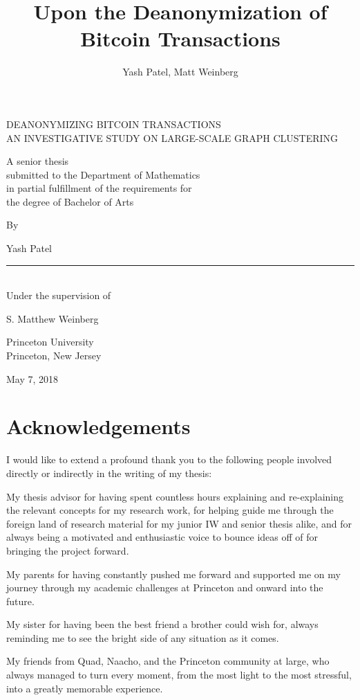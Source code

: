 \documentclass{article}
\begin{document}
\title{Upon the Deanonymization of Bitcoin Transactions}
\author{Yash Patel, Matt Weinberg}

\begin{center}
\thispagestyle{empty}
\parskip=14pt%
\vspace*{5\parskip}%
\LARGE{DEANONYMIZING BITCOIN TRANSACTIONS} \\
\large{AN INVESTIGATIVE STUDY ON LARGE-SCALE GRAPH CLUSTERING}

\vspace*{5\parskip}%
\large{A senior thesis \\
submitted to the Department of Mathematics \\
in partial fulfillment of the requirements for \\
the degree of Bachelor of Arts}

\vspace*{4\parskip}%
By

Yash Patel

\rule{7cm}{0.4pt}\\
Under the supervision of

S. Matthew Weinberg

Princeton University\\
Princeton, New Jersey

May 7, 2018
\end{center}
\clearpage

\doublespacing
\section*{Acknowledgements}
I would like to extend a profound thank you to the following people involved directly or indirectly in the writing of my thesis:

My thesis advisor for having spent countless hours explaining and re-explaining the relevant concepts for my research work, for helping guide me through the foreign land of research material for my junior IW and senior thesis alike, and for always being a motivated and enthusiastic voice to bounce ideas off of for bringing the project forward.

My parents for having constantly pushed me forward and supported me on my journey through my academic challenges at Princeton and onward into the future.

My sister for having been the best friend a brother could wish for, always reminding me to see the bright side of any situation as it comes. 

My friends from Quad, Naacho, and the Princeton community at large, who always managed to turn every moment, from the most light to the most stressful, into a greatly memorable experience.
\end{document}
